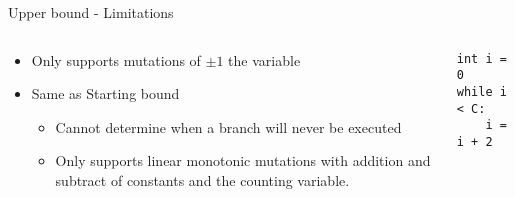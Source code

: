 \begin{frame}[fragile]{Upper bound - Limitations}

\begin{columns}

\begin{column}{0.5\textwidth}
\begin{itemize}
\item Only supports mutations of $\pm 1$ the variable
\item Same as Starting bound
\begin{itemize}
    \item Cannot determine when a branch will never be executed
    \item Only supports linear monotonic mutations with addition and subtract
        of constants and the counting variable.
\end{itemize}
\end{itemize}
\end{column}

\begin{column}{0.5\textwidth}
\begin{verbatim}
int i = 0
while i < C:
    i = i + 2
\end{verbatim}
\end{column}

\end{columns}
\end{frame}




